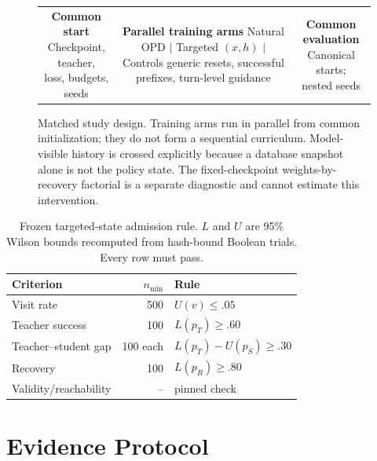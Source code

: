 \documentclass[11pt,a4paper]{article}
\begin{document}
\begin{figure}[t]
\centering
\small
\setlength{\tabcolsep}{4pt}
\begin{tabular}{c@{\quad$\Longrightarrow$\quad}c@{\quad$\Longrightarrow$\quad}c}
\fbox{\parbox{0.19\textwidth}{\centering
\textbf{Common start}\\
Checkpoint, teacher,\\
loss, budgets, seeds}}
&
\fbox{\parbox{0.39\textwidth}{\centering
\textbf{Parallel training arms}\\
Natural OPD \quad $\vert$ \quad Targeted $(x,h)$ \quad $\vert$ \quad Controls\\
\scriptsize generic resets, successful prefixes, turn-level guidance}}
&
\fbox{\parbox{0.19\textwidth}{\centering
\textbf{Common evaluation}\\
Canonical starts;\\
nested seeds}}
\end{tabular}
\caption{Matched study design. Training arms run in
parallel from common initialization; they do not form a sequential curriculum.
Model-visible history is crossed explicitly because a database snapshot alone
is not the policy state. The fixed-checkpoint weights-by-recovery factorial is a
separate diagnostic and cannot estimate this intervention.}
\label{fig:intervention}
\end{figure}

\begin{table}[t]
\caption{Frozen targeted-state admission rule. $L$ and $U$ are 95\% Wilson
bounds recomputed from hash-bound Boolean trials. Every row must pass.}
\label{tab:selector}
\centering
\small
\setlength{\tabcolsep}{3pt}
\begin{tabular}{@{}lrl@{}}
\toprule
Criterion & $n_{\min}$ & Rule \\
\midrule
Visit rate & 500 & $U(v)\leq .05$ \\
Teacher success & 100 & $L(p_T)\geq .60$ \\
Teacher--student gap & 100 each & $L(p_T)-U(p_S)\geq .30$ \\
Recovery & 100 & $L(p_R)\geq .80$ \\
Validity/reachability & -- & pinned check \\
\bottomrule
\end{tabular}
\end{table}

\section{Evidence Protocol}
\end{document}
